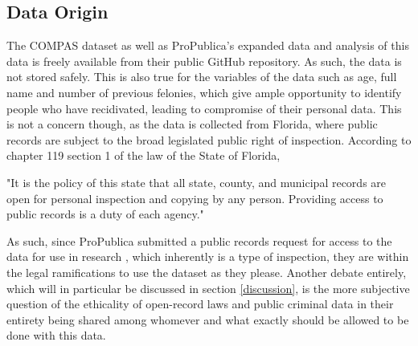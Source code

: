 \documentclass[11pt, fleqn, titlepage]{article}
\begin{document}
	
	
	\subsection{Data Origin}
	The COMPAS dataset as well as ProPublica's expanded data and analysis of this data is freely available from their public GitHub repository. As such, the data is not stored safely. This is also true for the variables of the data such as age, full name and number of previous felonies, which give ample opportunity to identify people who have recidivated, leading to compromise of their personal data. This is not a concern though, as the data is collected from Florida, where public records are subject to the broad legislated public right of inspection. According to chapter 119 section 1 of the law of the State of Florida, 
	\begin{displayquote}
		"It is the policy of this state that all state, county, and municipal records are open for personal inspection and copying by any person. Providing access to public records is a duty of each agency." \cite{floridaLaw}
	\end{displayquote}
	
	\noindent As such, since ProPublica submitted a public records request for access to the data for use in research \cite{propublicaAnalysis}, which inherently is a type of inspection, they are within the legal ramifications to use the dataset as they please. Another debate entirely, which will in particular be discussed in section \ref{discussion}, is the more subjective question of the ethicality of open-record laws and public criminal data in their entirety being shared among whomever and what exactly should be allowed to be done with this data.
	
		
\end{document}
